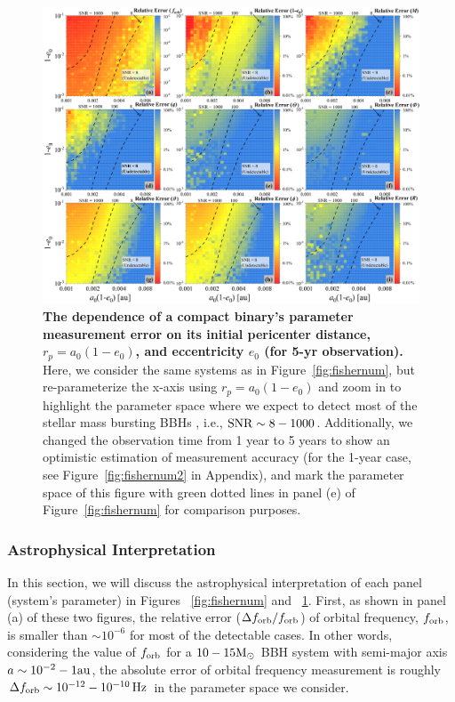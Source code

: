 \documentclass[%
 reprint,
 amsmath,amssymb,
 aps,
]{revtex4-2}
\begin{document}
\begin{figure}[htbp]
    \centering
    \includegraphics[width=7in]{5yr.png} 
    \caption{{\bf{The dependence of a compact binary's parameter measurement error on its initial pericenter distance, $r_p= a_0(1-e_0)$, and eccentricity $e_0$ (for 5-yr observation).  }}
    Here, we consider the same systems as in Figure~\ref{fig:fishernum}, but re-parameterize the x-axis using $r_p= a_0(1-e_0)$ and zoom in to highlight the parameter space where we expect to detect most of the stellar mass bursting BBHs \citep{Xuan+23b,Xuan24bkg}, i.e., $
    \rm SNR\sim 8 - 1000$. Additionally, we changed the observation time from 1 year to 5 years to show an optimistic estimation of measurement accuracy (for the 1-year case, see Figure~\ref{fig:fishernum2} in Appendix), and mark the parameter space of this figure with green dotted lines in panel (e) of Figure~\ref{fig:fishernum} for comparison purposes.}
    \label{fig:fishernum3}
\end{figure}

 
\subsubsection{Astrophysical Interpretation}
\label{subsec:astrointerpretation}
In this section, we will discuss the astrophysical interpretation of each panel (system's parameter) in Figures ~\ref{fig:fishernum} and ~\ref{fig:fishernum3}. First, as shown in panel (a) of these two figures, the relative error ($\Delta f_{\rm orb}/f_{\rm orb}$) of orbital frequency, $f_{\rm orb}$, is smaller than $\sim 10^{-6}$ for most of the detectable cases. In other words, considering the value of $f_{\rm orb}$ for a $10-15\rm M_{\odot}$ BBH system with semi-major axis $a\sim 10^{-2} - 1\rm au$, the absolute error of orbital frequency measurement is roughly $\Delta f_{\rm orb}\sim 10^{-12} - 10^{-10}\, \rm Hz$ in the parameter space we consider. 
\end{document}
